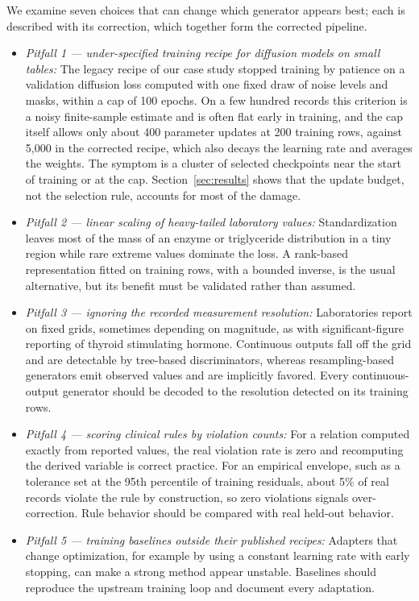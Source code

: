 \documentclass[conference]{IEEEtran}
\begin{document}
We examine seven choices that can change which generator appears best; each is described with its correction, which together form the corrected pipeline.
\begin{itemize}
\item \textit{Pitfall 1 --- under-specified training recipe for diffusion models on small tables:} The legacy recipe of our case study stopped training by patience on a validation diffusion loss computed with one fixed draw of noise levels and masks, within a cap of 100 epochs. On a few hundred records this criterion is a noisy finite-sample estimate and is often flat early in training, and the cap itself allows only about 400 parameter updates at 200 training rows, against 5,000 in the corrected recipe, which also decays the learning rate and averages the weights. The symptom is a cluster of selected checkpoints near the start of training or at the cap. Section~\ref{sec:results} shows that the update budget, not the selection rule, accounts for most of the damage.
\item \textit{Pitfall 2 --- linear scaling of heavy-tailed laboratory values:} Standardization leaves most of the mass of an enzyme or triglyceride distribution in a tiny region while rare extreme values dominate the loss. A rank-based representation fitted on training rows, with a bounded inverse, is the usual alternative, but its benefit must be validated rather than assumed.
\item \textit{Pitfall 3 --- ignoring the recorded measurement resolution:} Laboratories report on fixed grids, sometimes depending on magnitude, as with significant-figure reporting of thyroid stimulating hormone. Continuous outputs fall off the grid and are detectable by tree-based discriminators, whereas resampling-based generators emit observed values and are implicitly favored. Every continuous-output generator should be decoded to the resolution detected on its training rows.
\item \textit{Pitfall 4 --- scoring clinical rules by violation counts:} For a relation computed exactly from reported values, the real violation rate is zero and recomputing the derived variable is correct practice. For an empirical envelope, such as a tolerance set at the 95th percentile of training residuals, about 5\% of real records violate the rule by construction, so zero violations signals over-correction. Rule behavior should be compared with real held-out behavior.
\item \textit{Pitfall 5 --- training baselines outside their published recipes:} Adapters that change optimization, for example by using a constant learning rate with early stopping, can make a strong method appear unstable. Baselines should reproduce the upstream training loop and document every adaptation.

\end{itemize}
\end{document}
